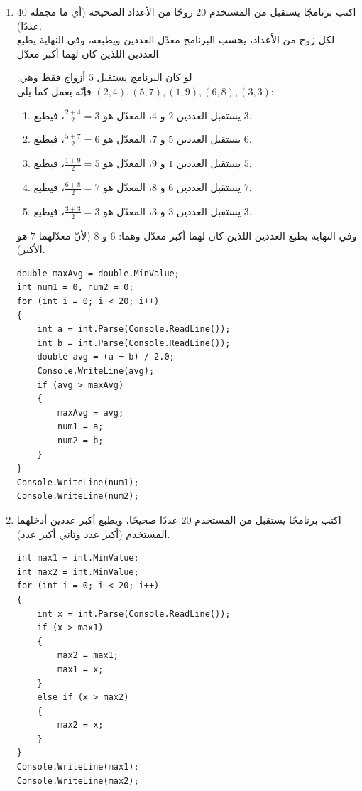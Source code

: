 \documentclass[14pt]{extarticle}
\begin{document}
\begin{enumerate}[resume, itemsep=2em]
\item اكتب برنامجًا يستقبل من المستخدم $20$ زوجًا من الأعداد الصحيحة (أي ما مجمله $40$ عددًا). \\
لكل زوج من الأعداد، يحسب البرنامج معدّل العددين ويطبعه، وفي النهاية يطبع العددين اللذين كان لهما أكبر معدّل.
\ifdetailed
\begin{boxExample}
لو كان البرنامج يستقبل $5$ أزواج فقط وهي: $(2,4), (5,7), (1,9), (6,8), (3,3)$ فإنّه يعمل كما يلي:
\begin{enumerate}[label=(\arabic*), nosep]
    \item يستقبل العددين $2$ و $4$، المعدّل هو $\frac{2+4}{2} = 3$، فيطبع $3$.
    \item يستقبل العددين $5$ و $7$، المعدّل هو $\frac{5+7}{2} = 6$، فيطبع $6$.
    \item يستقبل العددين $1$ و $9$، المعدّل هو $\frac{1+9}{2} = 5$، فيطبع $5$.
    \item يستقبل العددين $6$ و $8$، المعدّل هو $\frac{6+8}{2} = 7$، فيطبع $7$.
    \item يستقبل العددين $3$ و $3$، المعدّل هو $\frac{3+3}{2} = 3$، فيطبع $3$.
\end{enumerate}
وفي النهاية يطبع العددين اللذين كان لهما أكبر معدّل وهما: $6$ و $8$ (لأنّ معدّلهما $7$ هو الأكبر).
\end{boxExample}
\fi
\ifwithsols
\begin{boxSolution}
\begin{english}
\begin{verbatim}
double maxAvg = double.MinValue;
int num1 = 0, num2 = 0;
for (int i = 0; i < 20; i++)
{
    int a = int.Parse(Console.ReadLine());
    int b = int.Parse(Console.ReadLine());
    double avg = (a + b) / 2.0;
    Console.WriteLine(avg);
    if (avg > maxAvg)
    {
        maxAvg = avg;
        num1 = a;
        num2 = b;
    }
}
Console.WriteLine(num1);
Console.WriteLine(num2);
\end{verbatim}
\end{english}
\end{boxSolution}
\fi
\filbreak

\item اكتب برنامجًا يستقبل من المستخدم $20$ عددًا صحيحًا، ويطبع أكبر عددين أدخلهما المستخدم (أكبر عدد وثاني أكبر عدد).
\ifwithsols
\begin{boxSolution}
\begin{english}
\begin{verbatim}
int max1 = int.MinValue;
int max2 = int.MinValue;
for (int i = 0; i < 20; i++)
{
    int x = int.Parse(Console.ReadLine());
    if (x > max1)
    {
        max2 = max1;
        max1 = x;
    }
    else if (x > max2)
    {
        max2 = x;
    }
}
Console.WriteLine(max1);
Console.WriteLine(max2);
\end{verbatim}
\end{english}
\end{boxSolution}
\fi
\filbreak


\end{enumerate}
\end{document}
